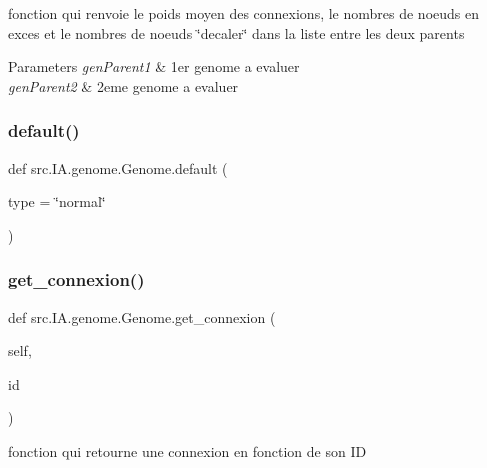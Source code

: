 fonction qui renvoie le poids moyen des connexions, le nombres de noeuds en exces et le nombres de noeuds \char`\"{}decaler\char`\"{} dans la liste entre les deux parents 


\begin{DoxyParams}{Parameters}
{\em gen\+Parent1} & 1er genome a evaluer \\
\hline
{\em gen\+Parent2} & 2eme genome a evaluer \\
\hline
\end{DoxyParams}
\mbox{\label{classsrc_1_1_i_a_1_1genome_1_1_genome_abaffc777e83e14be746e97f0b7b30738}} 
\subsubsection{\texorpdfstring{default()}{default()}}
{\footnotesize\ttfamily def src.\+I\+A.\+genome.\+Genome.\+default (\begin{DoxyParamCaption}\item[{}]{type = {\ttfamily \char`\"{}normal\char`\"{}} }\end{DoxyParamCaption})\hspace{0.3cm}{\ttfamily [static]}}

\mbox{\label{classsrc_1_1_i_a_1_1genome_1_1_genome_a07ebf660dfb9962a4ceeb078537c5fb1}} 
\subsubsection{\texorpdfstring{get\+\_\+connexion()}{get\_connexion()}}
{\footnotesize\ttfamily def src.\+I\+A.\+genome.\+Genome.\+get\+\_\+connexion (\begin{DoxyParamCaption}\item[{}]{self,  }\item[{}]{id }\end{DoxyParamCaption})}



fonction qui retourne une connexion en fonction de son ID 


